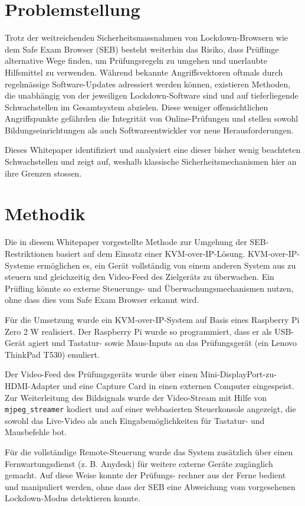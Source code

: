 \documentclass[14pt]{article}
\begin{document}
\section{Problemstellung}
Trotz der weitreichenden Sicherheitsmassnahmen von Lockdown-Browsern wie dem Safe Exam Browser (SEB) besteht weiterhin das Risiko, dass Prüflinge alternative Wege finden, um Prüfungsregeln zu umgehen und unerlaubte Hilfsmittel zu verwenden. Während bekannte Angriffsvektoren oftmals durch regelmässige Software-Updates adressiert werden können, existieren Methoden, die unabhängig von der jeweiligen Lockdown-Software sind und auf tieferliegende Schwachstellen im Gesamtsystem abzielen. Diese weniger offensichtlichen Angriffspunkte gefährden die Integrität von Online-Prüfungen und stellen sowohl Bildungseinrichtungen als auch Softwareentwickler vor neue Herausforderungen.

Dieses Whitepaper identifiziert und analysiert eine dieser bisher wenig beachteten Schwachstellen und zeigt auf, weshalb klassische Sicherheitsmechanismen hier an ihre Grenzen stossen.

\section{Methodik}

Die in diesem Whitepaper vorgestellte Methode zur Umgehung der SEB-Restriktionen basiert auf dem Einsatz einer KVM-over-IP-Lösung. KVM-over-IP-Systeme ermöglichen es, ein Gerät vollständig von einem anderen System aus zu steuern und gleichzeitig den Video-Feed des Zielgeräts zu überwachen. Ein Prüfling könnte so externe Steuerungs- und Überwachungsmechanismen nutzen, ohne dass dies vom Safe Exam Browser erkannt wird.

Für die Umsetzung wurde ein KVM-over-IP-System auf Basis eines Raspberry Pi Zero 2 W realisiert. Der Raspberry Pi wurde so programmiert, dass er als USB-Gerät agiert und Tastatur- sowie Maus-Inputs an das Prüfungsgerät (ein Lenovo ThinkPad T530) emuliert.

Der Video-Feed des Prüfungsgeräts wurde über einen Mini-DisplayPort-zu-HDMI-Adapter und eine Capture Card in einen externen Computer eingespeist. Zur Weiterleitung des Bildsignals wurde der Video-Stream mit Hilfe von \verb+mjpeg_streamer+ kodiert und auf einer webbasierten Steuerkonsole angezeigt, die sowohl das Live-Video als auch Eingabemöglichkeiten für Tastatur- und Mausbefehle bot.

Für die vollständige Remote-Steuerung wurde das System zusätzlich über einen Fernwartungsdienst (z. B. Anydesk) für weitere externe Geräte zugänglich gemacht. Auf diese Weise konnte der Prüfungs- rechner aus der Ferne bedient und manipuliert werden, ohne dass der SEB eine Abweichung vom vorgesehenen Lockdown-Modus detektieren konnte.
\end{document}
